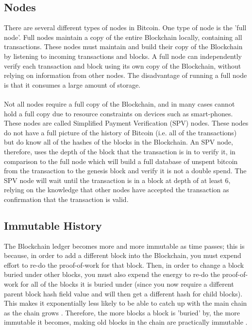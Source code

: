 \subsection{Nodes}\label{background-nodes}
There are several different types of nodes in Bitcoin. One type of node is the 'full node'. Full nodes maintain a copy of the entire Blockchain locally, containing all transactions. These nodes must maintain and build their copy of the Blockchain by listening to incoming transactions and blocks. A full node can independently verify each transaction and block using its own copy of the Blockchain, without relying on information from other nodes. The disadvantage of running a full node is that it consumes a large amount of storage. 
\\\\
Not all nodes require a full copy of the Blockchain, and in many cases cannot hold a full copy due to resource constraints on devices such as smart-phones. These nodes are called Simplified Payment Verification (SPV)\cite{RefWorks:doc:5c39e80ae4b0854ae611b047} nodes. These nodes do not have a full picture of the history of Bitcoin (i.e. all of the transactions) but do know all of the hashes of the blocks in the Blockchain. An SPV node, therefore, uses the depth of the block that the transaction is in to verify it, in comparison to the full node which will build a full database of unspent bitcoin from the transaction to the genesis block and verify it is not a double spend. The SPV node will wait until the transaction is in a block at depth of at least 6, relying on the knowledge that other nodes have accepted the transaction as confirmation that the transaction is valid. 

\subsection{Immutable History}
The Blockchain ledger becomes more and more immutable as time passes; this is because, in order to add a different block into the Blockchain, you must expend effort to re-do the proof-of-work for that block. Then, in order to change a block buried under other blocks, you must also expend the energy to re-do the proof-of-work for all of the blocks it is buried under (since you now require a different parent block hash field value and will then get a different hash for child blocks). This makes it exponentially less likely to be able to catch up with the main chain as the chain grows \cite{RefWorks:doc:5c3b547fe4b0613d0cda0434}. Therefore, the more blocks a block is 'buried' by, the more immutable it becomes, making old blocks in the chain are practically immutable \cite{RefWorks:doc:5c39e80ae4b0854ae611b047}. 

